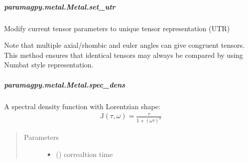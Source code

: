 \documentclass[a4paper,10pt,english,openany,oneside]{sphinxmanual}
\begin{document}
\begin{fulllineitems}
\begin{fulllineitems}
\begin{fulllineitems}
\end{fulllineitems}



\subparagraph{paramagpy.metal.Metal.set\_utr}
\label{\detokenize{reference/generated/paramagpy.metal.Metal.set_utr:paramagpy-metal-metal-set-utr}}\label{\detokenize{reference/generated/paramagpy.metal.Metal.set_utr::doc}}

\begin{fulllineitems}
\label{\detokenize{reference/generated/paramagpy.metal.Metal.set_utr:paramagpy.metal.Metal.set_utr}}
\sphinxAtStartPar
Modify current tensor parameters to unique tensor representation (UTR)

\sphinxAtStartPar
Note that multiple axial/rhombic and euler angles can give congruent
tensors.
This method ensures that identical tensors may always be compared
by using Numbat style representation.

\end{fulllineitems}



\subparagraph{paramagpy.metal.Metal.spec\_dens}
\label{\detokenize{reference/generated/paramagpy.metal.Metal.spec_dens:paramagpy-metal-metal-spec-dens}}\label{\detokenize{reference/generated/paramagpy.metal.Metal.spec_dens::doc}}

\begin{fulllineitems}
\label{\detokenize{reference/generated/paramagpy.metal.Metal.spec_dens:paramagpy.metal.Metal.spec_dens}}
\sphinxAtStartPar
A spectral density function with Lorentzian shape:
\begin{equation*}
\begin{split}\mathbb{J}(\tau,\omega)=\frac{\tau}{1+(\omega\tau)^2}\end{split}
\end{equation*}\begin{quote}\begin{description}
\item[{Parameters}] \leavevmode\begin{itemize}
\item {} 
\sphinxAtStartPar
{} () \textendash{} correaltion time


\end{itemize}
\end{description}
\end{quote}
\end{fulllineitems}
\end{fulllineitems}
\end{fulllineitems}
\end{document}
